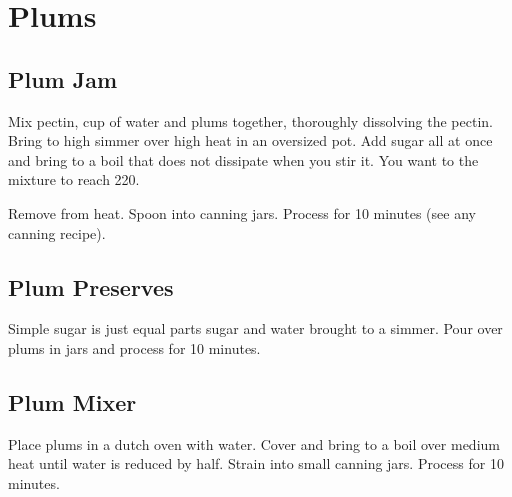 \section{Plums}
\begin{recipe}

\subsection{Plum Jam}



Mix pectin,  cup of water and plums together, thoroughly dissolving
the pectin. Bring to high simmer over high heat in an oversized pot. Add
sugar all at once and bring to a boil that does not dissipate when you stir it.
You want to the mixture to reach 220\degree{}.

Remove from heat. Spoon into canning jars. Process for 10 minutes (see any canning recipe).

\subsection{Plum Preserves}



Simple sugar is just equal parts sugar and water brought to a simmer. Pour over
plums in jars and process for 10 minutes.

\subsection{Plum Mixer}



Place plums in a dutch oven with water. Cover and bring to a boil over
medium heat until water is reduced by half.  Strain into small canning jars. Process for
10 minutes.

\end{recipe}
